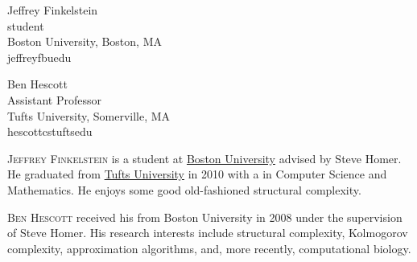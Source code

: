 \begin{tocauthors}
  \begin{tocinfo}[jeffrey]
    Jeffrey Finkelstein\\
    \phd{} student\\
    Boston University, Boston, MA\\
    jeffreyf\tocat{}bu\tocdot{}edu\\
  \end{tocinfo}
  \begin{tocinfo}[ben]
    Ben Hescott\\
    Assistant Professor\\
    Tufts University, Somerville, MA\\
    hescott\tocat{}cs\tocdot{}tufts\tocdot{}edu\\
  \end{tocinfo}
\end{tocauthors}

\begin{tocaboutauthors}
  \begin{tocabout}[jeffrey]
    \textsc{Jeffrey Finkelstein} is a \phd{} student at \href{http://www.bu.edu}{Boston University} advised by Steve Homer.
    He graduated from \href{http://www.tufts.edu}{Tufts University} in 2010 with a \bsc{} in Computer Science and Mathematics.
    He enjoys some good old-fashioned structural complexity.
  \end{tocabout}
  \begin{tocabout}[ben]
    \textsc{Ben Hescott} received his \phd{} from Boston University in 2008 under the supervision of Steve Homer.
    His research interests include structural complexity, Kolmogorov complexity, approximation algorithms, and, more recently, computational biology.
  \end{tocabout}
\end{tocaboutauthors}
